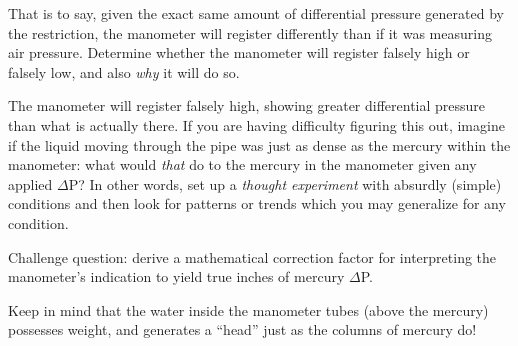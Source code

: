 That is to say, given the exact same amount of differential pressure generated by the restriction, the manometer will register differently than if it was measuring air pressure.  Determine whether the manometer will register falsely high or falsely low, and also {\it why} it will do so.







The manometer will register falsely high, showing greater differential pressure than what is actually there.  If you are having difficulty figuring this out, imagine if the liquid moving through the pipe was just as dense as the mercury within the manometer: what would {\it that} do to the mercury in the manometer given any applied $\Delta$P?  In other words, set up a {\it thought experiment} with absurdly (simple) conditions and then look for patterns or trends which you may generalize for any condition.

\vskip 10pt

Challenge question: derive a mathematical correction factor for interpreting the manometer's indication to yield true inches of mercury $\Delta$P.







Keep in mind that the water inside the manometer tubes (above the mercury) possesses weight, and generates a ``head'' just as the columns of mercury do!




